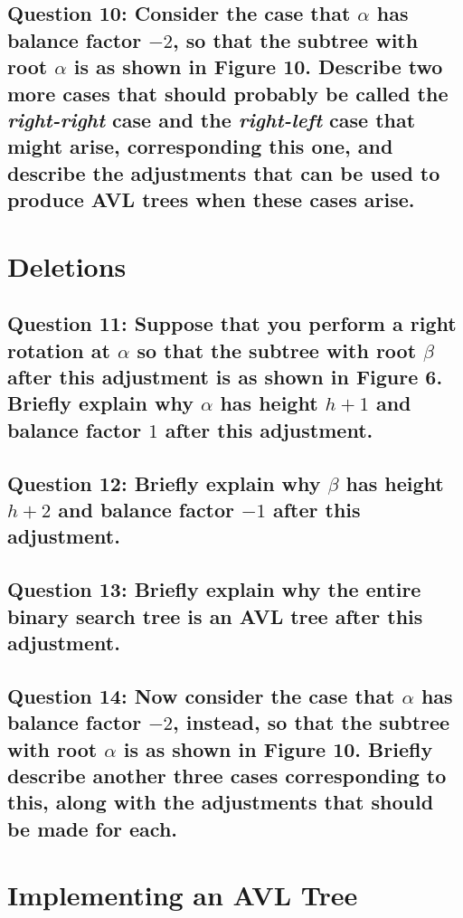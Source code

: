 \documentclass[a4paper, 12pt, titlepage]{article}
\begin{document}
\subsection*{Question 10: Consider the case that $\alpha$ has balance factor $-2$, so that the subtree with root $\alpha$ is as shown in Figure 10. Describe two more cases that should probably be called the \textit{right-right} case and the \textit{right-left} case that might arise, corresponding this one, and describe the adjustments that can be used to produce AVL trees when these cases arise.} 

\section*{Deletions}

\subsection*{Question 11: Suppose that you perform a right rotation at $\alpha$ so that the subtree with root $\beta$ after this adjustment is as shown in Figure 6. Briefly explain why $\alpha$ has height $h+1$ and balance factor $1$ after this adjustment.} 

\subsection*{Question 12: Briefly explain why $\beta$ has height $h+2$ and balance factor $-1$ after this adjustment.} 

\subsection*{Question 13: Briefly explain why the entire binary search tree is an AVL tree after this adjustment.} 

\subsection*{Question 14: Now consider the case that $\alpha$ has balance factor $-2$, instead, so that the subtree with root $\alpha$ is as shown in Figure 10. Briefly describe another three cases corresponding to this, along with the adjustments that should be made for each.} 

\section*{Implementing an AVL Tree}
\end{document}
